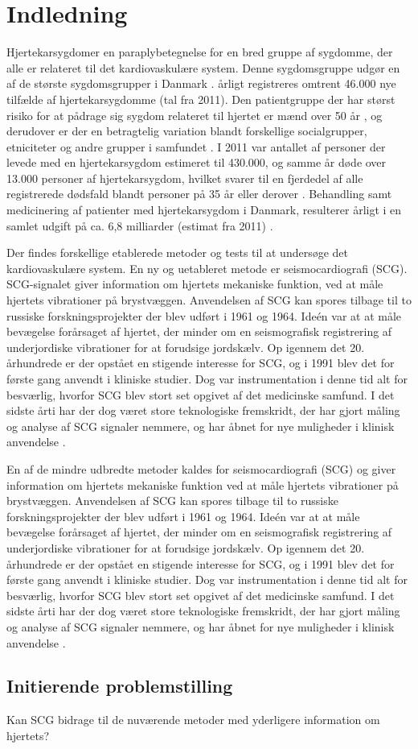 \chapter{Indledning} \label{Indledning}

\textquotedbl Hjertekarsygdom\textquotedbl er en paraplybetegnelse for en bred gruppe af sygdomme, der alle er relateret til det kardiovaskulære system. Denne sygdomsgruppe udgør en af de største sygdomsgrupper i Danmark \cite{livet}. årligt registreres omtrent 46.000 nye tilfælde af hjertekarsygdomme (tal fra 2011). Den patientgruppe der har størst risiko for at pådrage sig sygdom relateret til hjertet er mænd over 50 år \cite{2011}, og derudover er der en betragtelig variation blandt forskellige socialgrupper, etniciteter og andre grupper i samfundet \cite{hjerteforening}. I 2011 var antallet af personer der levede med en hjertekarsygdom estimeret til 430.000, og samme år døde over 13.000 personer af hjertekarsygdom, hvilket svarer til en fjerdedel af alle registrerede dødsfald blandt personer på 35 år eller derover \cite{2011}. Behandling samt medicinering af patienter med hjertekarsygdom i Danmark, resulterer årligt i en samlet udgift på ca. 6,8 milliarder (estimat fra 2011) \cite{hjerteforening}. 

Der findes forskellige etablerede metoder og tests til at undersøge det kardiovaskulære system. En ny og uetableret metode er seismocardiografi (SCG). SCG-signalet giver information om hjertets mekaniske funktion, ved at måle hjertets vibrationer på brystvæggen. Anvendelsen af SCG kan spores tilbage til to russiske forskningsprojekter der blev udført  i 1961 og 1964. Ideén var at at måle bevægelse forårsaget af hjertet, der minder om en seismografisk registrering af underjordiske vibrationer for at forudsige jordskælv. Op igennem det 20. århundrede er der opstået en stigende interesse for SCG, og i 1991 blev det for første gang anvendt i kliniske studier. Dog var instrumentation i denne tid alt for besværlig, hvorfor SCG blev stort set opgivet af det medicinske samfund. I det sidste årti har der dog været store teknologiske fremskridt, der har gjort måling og analyse af SCG signaler nemmere, og har åbnet for nye muligheder i klinisk anvendelse \cite{onan} \cite{zanetti}.



 En af de mindre udbredte metoder kaldes for seismocardiografi (SCG) og giver information om hjertets mekaniske funktion ved at måle hjertets vibrationer på brystvæggen. Anvendelsen af SCG kan spores tilbage til to russiske forskningsprojekter der blev udført  i 1961 og 1964. Ideén var at at måle bevægelse forårsaget af hjertet, der minder om en seismografisk registrering af underjordiske vibrationer for at forudsige jordskælv. Op igennem det 20. århundrede er der opstået en stigende interesse for SCG, og i 1991 blev det for første gang anvendt i kliniske studier. Dog var instrumentation i denne tid alt for besværlig, hvorfor SCG blev stort set opgivet af det medicinske samfund. I det sidste årti har der dog været store teknologiske fremskridt, der har gjort måling og analyse af SCG signaler nemmere, og har åbnet for nye muligheder i klinisk anvendelse \cite{onan} \cite{zanetti}.

\section{Initierende problemstilling} Kan SCG bidrage til de nuværende metoder med yderligere information om hjertets?